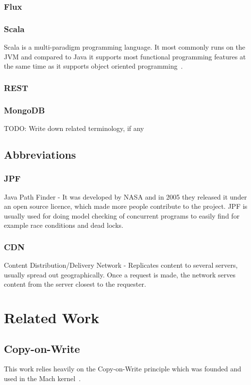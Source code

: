 \documentclass[a4paper,12pt]{article}
\begin{document}
\subsubsection{Flux}


\subsubsection{Scala}
Scala is a multi-paradigm programming language. It most commonly runs on the JVM and compared to Java it supports 
most functional programming features at the same time as it supports object oriented programming~\cite{SCALA}.

\subsubsection{REST}
\subsubsection{MongoDB}
    TODO: Write down related terminology, if any
\subsection{Abbreviations}

\subsubsection{JPF}
Java Path Finder - It was developed by NASA and in 2005 they released it under an open source licence, which made more 
people contribute to the project. JPF is usually used for doing model checking of concurrent programs to easily find 
for example race conditions and dead locks.

\subsubsection{CDN}
Content Distribution/Delivery Network - Replicates content to several servers, usually spread out geographically. Once a 
request is made, the network serves content from the server closest to the requester.

\section{Related Work}
\subsection{Copy-on-Write}
This work relies heavily on the Copy-on-Write principle which was founded and used in the Mach kernel~\cite{COPYONWRITE}. 
\end{document}
